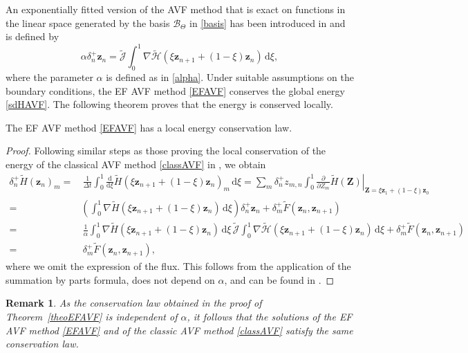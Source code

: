 \documentclass[twoside]{article}
\newtheorem{remark}{Remark}
\numberwithin{equation}{section}
\begin{document}
An exponentially fitted version of the AVF method that is exact on functions in the linear space generated by the basis $\mathcal{B}_\Theta$ in \eqref{basis} has been introduced in \cite{Miya} and is defined by
\begin{equation}\label{EFAVF}
\alpha\delta_n^+\mathbf{z}_n=\widetilde{\mathcal{J}}\int_0^1\nabla \widetilde{\mathcal{H}}(\xi\mathbf{z}_{n+1}+(1-\xi)\mathbf{z}_n)\,\mathrm{d}\xi,
\end{equation}
where the parameter $\alpha$ is defined as in \eqref{alpha}. Under suitable assumptions on the boundary conditions, the EF AVF method \eqref{EFAVF} conserves the global energy \eqref{sdHAVF}. The following theorem proves that the energy is conserved locally.
\begin{theorem}\label{theoEFAVF}
The EF AVF method \eqref{EFAVF} has a local energy conservation law.
\end{theorem}
\begin{proof} Following similar steps as those proving the local conservation of the energy of the classical AVF method \eqref{classAVF} in \cite{Frasca-Caccia2021}, we obtain
\begin{align*}
\delta_n^+\widetilde{H}(\mathbf{z}_n)_m=&\,\frac{1}{\Delta t}\int_0^1\!\!\frac{\mathrm{d}}{\mathrm{d}\xi}\widetilde{H}(\xi\mathbf{z}_{n+1}+(1-\xi)\mathbf{z}_n)_m\,\mathrm{d}\xi=\sum_m \delta_n^+z_{m,n}\left.\int_0^1\frac{\partial}{\partial Z_m}\widetilde{H}(\mathbf{Z})\right\vert_{\mathbf{Z}=\xi \mathbf{z}_1+(1-\xi)\mathbf{z}_0}\\
=&\left(\int_0^1\nabla \widetilde{H}(\xi\mathbf{z}_{n+1}+(1-\xi)\mathbf{z}_n)\,\mathrm{d}\xi\right)\delta_n^+\mathbf{z}_n+\delta_m^+\widetilde{F}(\mathbf{z}_n,\mathbf{z}_{n+1})\\
=&\,\frac{1}\alpha\!\int_0^1\!\!\nabla \widetilde{H}(\xi\mathbf{z}_{n+1}+(1-\xi)\mathbf{z}_n)\,\mathrm{d}\xi\,\widetilde{\mathcal{J}}\!\int_0^1\!\!\nabla \widetilde{\mathcal{H}}(\xi\mathbf{z}_{n+1}+(1-\xi)\mathbf{z}_n)\,\mathrm{d}\xi+\delta_m^+\widetilde{F}(\mathbf{z}_n,\mathbf{z}_{n+1})\\
=&\,\delta_m^+\widetilde{F}(\mathbf{z}_n,\mathbf{z}_{n+1}),
\end{align*}
where we omit the expression of the flux. This follows from the application of the summation by parts formula, does not depend on $\alpha$, and can be found in \cite{Frasca-Caccia2021}.
\end{proof}
\begin{remark}
As the conservation law obtained in the proof of Theorem~\ref{theoEFAVF} is independent of $\alpha$, it follows that the solutions of the EF AVF method \eqref{EFAVF} and of the classic AVF method \eqref{classAVF} satisfy the same conservation law.
\end{remark}
\end{document}
